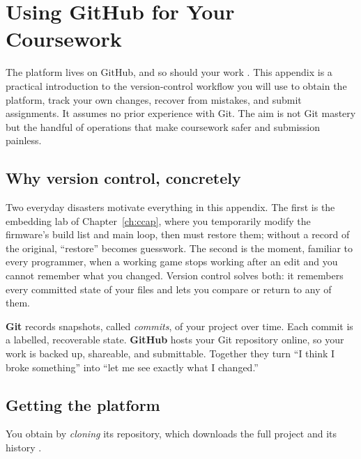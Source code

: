 \chapter{Using GitHub for Your Coursework}
\label{app:github}

The \prg platform lives on GitHub, and so should your work \citep{prg32repo}. This
appendix is a practical introduction to the version-control workflow you will use
to obtain the platform, track your own changes, recover from mistakes, and submit
assignments. It assumes no prior experience with Git. The aim is not Git mastery
but the handful of operations that make coursework safer and submission painless.

\section{Why version control, concretely}

Two everyday disasters motivate everything in this appendix. The first is the
embedding lab of Chapter~\ref{ch:ccap}, where you temporarily modify the firmware's
build list and main loop, then must restore them; without a record of the original,
``restore'' becomes guesswork. The second is the moment, familiar to every
programmer, when a working game stops working after an edit and you cannot remember
what you changed. Version control solves both: it remembers every committed state of
your files and lets you compare or return to any of them.

\begin{prgconcept}
\textbf{Git} records snapshots, called \emph{commits}, of your project over time.
Each commit is a labelled, recoverable state. \textbf{GitHub} hosts your Git
repository online, so your work is backed up, shareable, and submittable. Together
they turn ``I think I broke something'' into ``let me see exactly what I changed.''
\end{prgconcept}

\section{Getting the platform}

You obtain \prg by \emph{cloning} its repository, which downloads the full project
and its history \citep{prg32repo}.



